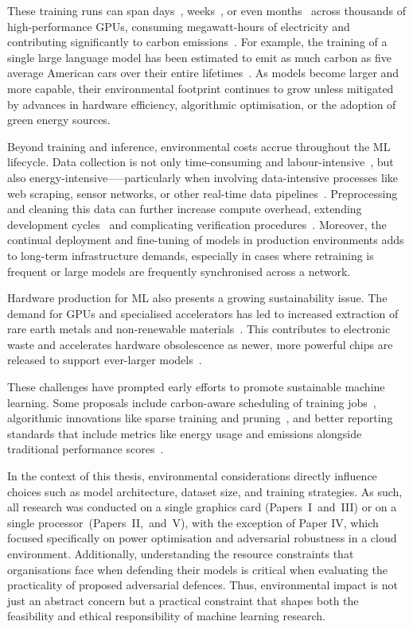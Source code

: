 These training runs can span days~\cite{vgg}, weeks~\cite{resnet}, or even months~\cite{llama} across thousands of high-performance GPUs, consuming megawatt-hours of electricity and contributing significantly to carbon emissions~\cite{strubell2020energy}. 
For example, the training of a single large language model has been estimated to emit as much carbon as five average American cars over their entire lifetimes~\cite{strubell2020energy}. 
As models become larger and more capable, their environmental footprint continues to grow unless mitigated by advances in hardware efficiency, algorithmic optimisation, or the adoption of green energy sources.

Beyond training and inference, environmental costs accrue throughout the ML lifecycle. 
Data collection is not only time-consuming and labour-intensive~\cite{roh2019survey}, but also energy-intensive—--particularly when involving data-intensive processes like web scraping, sensor networks, or other real-time data pipelines~\cite{ai_power}. 
Preprocessing and cleaning this data can further increase compute overhead, extending development cycles~\cite{lam2004new} and complicating verification procedures~\cite{zirger1996effect}. 
Moreover, the continual deployment and fine-tuning of models in production environments adds to long-term infrastructure demands, especially in cases where retraining is frequent or large models are frequently synchronised across a network.

Hardware production for ML also presents a growing sustainability issue. 
The demand for GPUs and specialised accelerators has led to increased extraction of rare earth metals and non-renewable materials~\cite{ai_environment}. 
This contributes to electronic waste and accelerates hardware obsolescence as newer, more powerful chips are released to support ever-larger models~\cite{desislavov2021compute}.

These challenges have prompted early efforts to promote sustainable machine learning. 
Some proposals include carbon-aware scheduling of training jobs~\cite{anthony2020carbontracker}, algorithmic innovations like sparse training and pruning~\cite{islam2024sustainable}, and better reporting standards that include metrics like energy usage and emissions alongside traditional performance scores~\cite{anthony2020carbontracker}.

In the context of this thesis, environmental considerations directly influence choices such as model architecture, dataset size, and training strategies. 
As such, all research was conducted on a single graphics card (Papers~I~and~III) or on a single processor~(Papers~II,~and~V), with the exception of Paper IV, which focused specifically on power optimisation and adversarial robustness in a cloud environment. 
Additionally, understanding the resource constraints that organisations face when defending their models is critical when evaluating the practicality of proposed adversarial defences.
Thus, environmental impact is not just an abstract concern but a practical constraint that shapes both the feasibility and ethical responsibility of machine learning research.

